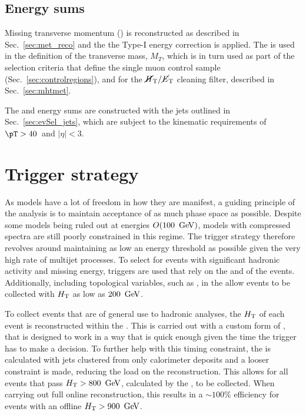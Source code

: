 \subsection{Energy sums}

Missing transverse momentum (\MET) is reconstructed as described in
Sec.~\ref{sec:met_reco} and the the Type-I \MET energy correction is applied.
The \met is used in the definition of 
the transverse mass, $M_{T}$, which is in turn used as part of
the selection criteria that define the single muon control sample 
(Sec.~\ref{sec:controlregions}), and for the $\mbox{$\mbox{$\cancel{H}_\text{T}$} / \mbox{$\cancel{E}_\text{T}$}$}$ cleaning
filter, described in Sec.~\ref{sec:mhtmet}.

The \HT and \MHT energy sums are constructed with the jets outlined in
Sec.~\ref{sec:evSel_jets}, which are subject to the kinematic requirements of
$\pT>40$~\gev and $|\eta|<3$.

\section{Trigger strategy}
\label{sec:trigStrat}

As \SUSY models have a lot of freedom in how they are manifest, a
guiding principle of the analysis is to maintain acceptance of as much
phase space as possible. Despite some \SUSY models being ruled out at
energies $O(100~\mathrm{\,Ge\kern -0.1em V})$, models with compressed spectra are still poorly
constrained in this regime. The trigger strategy therefore revolves
around maintaining as low an energy threshold as possible given the
very high rate of \QCD multijet processes. To select for events with
significant hadronic activity and missing energy, triggers are used
that rely on the \HT and \MHT of the events. Additionally, including
topological variables, such as \alphat, in the \HLT allow events to be
collected with $\mbox{$H_\text{T}$}$ as low as $200~\mathrm{\,Ge\kern -0.1em V}$.

To collect events that are of general use to hadronic analyses, the
$\mbox{$H_\text{T}$}$ of each event is reconstructed within the \HLT. This is carried
out with a custom form of \PF, that is designed to work in a way that
is quick enough given the time the trigger has to make a decision. To
further help with this timing constraint, the \HT is calculated with
jets clustered from only calorimeter deposits and a looser constraint
is made, reducing the load on the \PF reconstruction. This allows for
all events that pass $\mbox{$H_\text{T}$}>800~\mathrm{\,Ge\kern -0.1em V}$, calculated by the \HLT,
to be collected. When carrying out full online reconstruction, this
results in a $\sim 100\%$ efficiency for events with an offline
$\mbox{$H_\text{T}$}>900~\mathrm{\,Ge\kern -0.1em V}$. 

